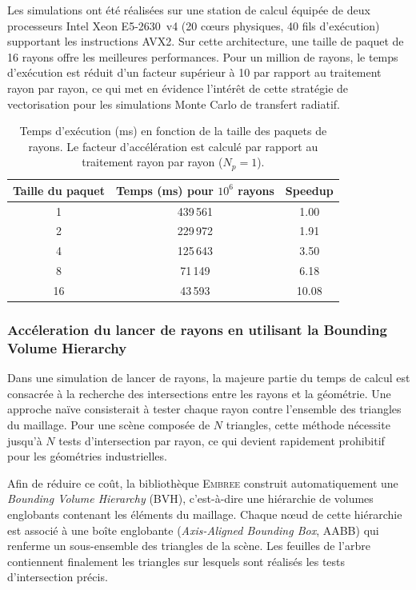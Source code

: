 Les simulations ont été réalisées sur une station de calcul équipée de deux processeurs Intel Xeon E5-2630~v4 (20 cœurs physiques, 40 fils d'exécution) supportant les instructions AVX2. Sur cette architecture, une taille de paquet de 16 rayons offre les meilleures performances. Pour un million de rayons, le temps d'exécution est réduit d'un facteur supérieur à 10 par rapport au traitement rayon par rayon, ce qui met en évidence l'intérêt de cette stratégie de vectorisation pour les simulations Monte Carlo de transfert radiatif.

\begin{table}[ht]
\centering


\begin{tabular}{ccc}
\toprule
Taille du paquet & Temps (ms) pour $10^6$ rayons & Speedup \\
\midrule
1  & 439\,561 & 1.00 \\
2  & 229\,972 & 1.91 \\
4  & 125\,643 & 3.50 \\
8  &  71\,149 & 6.18 \\
16 &  43\,593 & 10.08 \\
\bottomrule
\end{tabular}
\caption{Temps d'exécution (ms) en fonction de la taille des paquets de rayons. Le facteur d'accélération est calculé par rapport au traitement rayon par rayon ($N_p=1$).}
\label{tab:packet_perf}
\end{table}


\subsubsection{Accéleration du lancer de rayons en utilisant la Bounding Volume Hierarchy}

Dans une simulation de lancer de rayons, la majeure partie du temps de calcul est consacrée à la recherche des intersections entre les rayons et la géométrie. Une approche naïve consisterait à tester chaque rayon contre l'ensemble des triangles du maillage. Pour une scène composée de $N$ triangles, cette méthode nécessite jusqu'à $N$ tests d'intersection par rayon, ce qui devient rapidement prohibitif pour les géométries industrielles.

Afin de réduire ce coût, la bibliothèque \textsc{Embree} construit automatiquement une \emph{Bounding Volume Hierarchy} (BVH), c'est-à-dire une hiérarchie de volumes englobants contenant les éléments du maillage. Chaque nœud de cette hiérarchie est associé à une boîte englobante (\emph{Axis-Aligned Bounding Box}, AABB) qui renferme un sous-ensemble des triangles de la scène. Les feuilles de l'arbre contiennent finalement les triangles sur lesquels sont réalisés les tests d'intersection précis.

